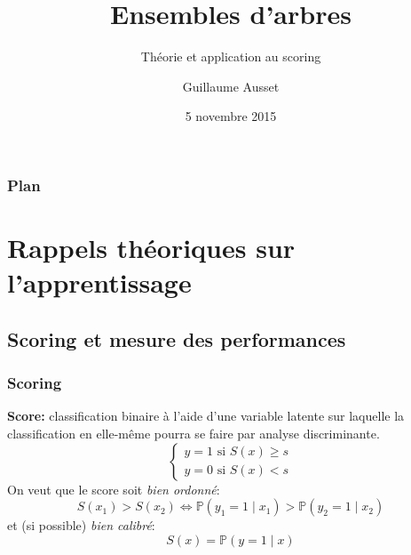 \documentclass[dvipsnames,10pt]{beamer}
\title{Ensembles d'arbres}
\subtitle{Théorie et application au scoring}
\author{Guillaume Ausset}
\institute{M2 MASEF - Crédit Agricole GRO}
\date{5 novembre 2015}
\theoremstyle{plain}
\theoremstyle{definition}
\begin{document}

\begin{frame}
    \titlepage
\end{frame}


\begin{frame}
\frametitle{Plan}
    \vspace{0.2cm}
    \tableofcontents
\end{frame}

\section{Rappels théoriques sur l'apprentissage}
\subsection{Scoring et mesure des performances}

\begin{frame}
\frametitle{Scoring}
\textbf{Score:} classification binaire à l'aide d'une variable latente sur laquelle la classification en elle-même pourra se faire par analyse discriminante.
    \begin{equation*}
        \begin{cases}
            y = 1 \text{ si } S(x) \geq s \\
            y = 0 \text{ si } S(x) < s
        \end{cases}
    \end{equation*}
On veut que le score soit \emph{bien ordonné}:
\begin{equation}
    S(x_1) > S(x_2) \Leftrightarrow \mathbb{P} \left( y_1 = 1 \mid x_1 \right) > \mathbb{P} \left( y_2 = 1 \mid x_2 \right)
    \label{equ:score.ordoné}
\end{equation}
et (si possible) \emph{bien calibré}:
\begin{equation*}
    S(x) = \mathbb{P} \left( y = 1 \mid x \right)
    \label{equ:score.calibré}
\end{equation*}
\end{frame}
\end{document}
